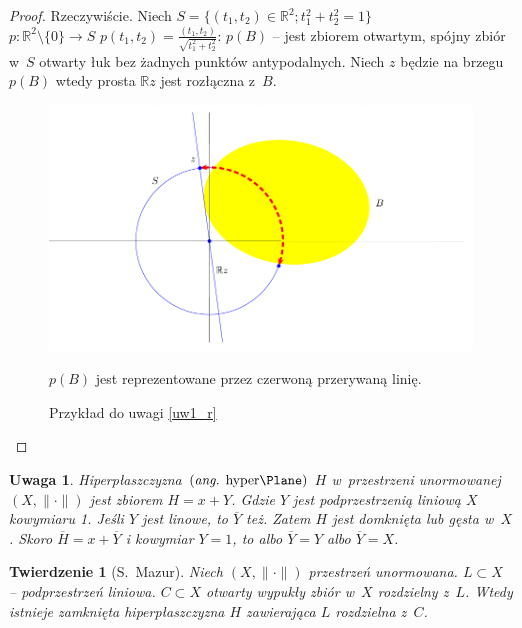 \documentclass[11pt]{mwrep}
\renewcommand{\[}{\begin{equation}}
\renewcommand{\]}{\end{equation}}
\newcommand{\R}{{\ensuremath{\mathbb R}}}
\newtheorem{twr}[subsection]{Twierdzenie}%
\newtheorem{uw}[subsection]{Uwaga}
\begin{document}
\begin{proof}
	Rzeczywiście. Niech $S= \{ (t_1, t_2) \in \R^2; t_1^2+t_2^2=1\}$ \\
	$p:\R^2\setminus\{0\} \to S$ $p(t_1,t_2) = \frac{(t_1,t_2)}{\sqrt{t_1^2+t_2^2}}$:
	$p(B)$ -- jest zbiorem otwartym, spójny zbiór w~$S$ otwarty łuk bez żadnych punktów antypodalnych.
Niech $z$ będzie na brzegu $p(B)$ wtedy prosta $\R z$ jest rozłączna z~$B$.\\
\begin{figure}[h]
  \centering
  \includegraphics[scale=.7]{rys1}
  \caption{Przykład do uwagi \ref{uw1_r}}
  \scriptsize{ $p(B)$ jest reprezentowane przez czerwoną przerywaną linię.}
\end{figure}
\end{proof}
\begin{uw}
  Hiperpłaszczyzna $\left(\textrm{\textit{ang.} hyper\Plane}\right)$ $H$ w~przestrzeni unormowanej $(X,\|\cdot\|)$ jest zbiorem $H= x+Y$. Gdzie $Y$ jest podprzestrzenią liniową $X$ kowymiaru 1.
	Jeśli $Y$ jest linowe, to $\overline{Y}$ też. Zatem $H$ jest domknięta lub gęsta w~$X$. 
	Skoro $\overline{H}=x+\overline{Y}$ i kowymiar $Y=1$, to albo $\overline{Y} = Y$ albo $\overline{Y} = X$.
\end{uw}
\begin{twr}[S.~Mazur]
  \label{maz}
	Niech $(X,\|\cdot\|)$ przestrzeń unormowana. $L\subset X$ -- podprzestrzeń liniowa. 
	$C\subset X$ otwarty wypukły zbiór w~$X$ rozdzielny z~$L$. Wtedy istnieje zamknięta hiperpłaszczyzna $H$ zawierająca $L$ rozdzielna z~$C$.
\end{twr}
\end{document}
